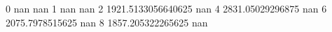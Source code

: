 0 nan nan
1 nan nan
2 1921.5133056640625 nan
4 2831.05029296875 nan
6 2075.7978515625 nan
8 1857.205322265625 nan
